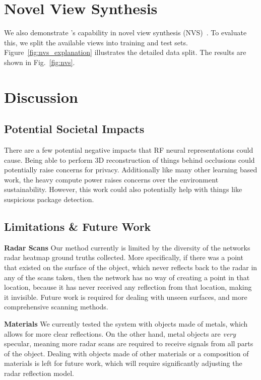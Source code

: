 
\section{Novel View Synthesis}
\label{sec:app-nvs}
We also demonstrate \name{}'s capability in novel view synthesis  (NVS)~\cite{mildenhall2021nerf}.
To evaluate this, we split the available views into training and test sets.
Figure~\ref{fig:nvs_explanation} illustrates the detailed data split. The results are shown in Fig.~\ref{fig:nvs}.


\section{Discussion}
\label{sec:app-discussion}
\subsection{Potential Societal Impacts}
There are a few potential negative impacts that RF neural representations could cause. Being able to perform 3D reconstruction of things behind occlusions could potentially raise concerns for privacy. Additionally like many other learning based work, the heavy compute power raises concerns over the environment sustainability. However, this work could also potentially help with things like suspicious package detection.

\subsection{Limitations \& Future Work}
\noindent \textbf{Radar Scans }Our method currently is limited by the diversity of the networks radar heatmap ground truths collected. More specifically, if there was a point that existed on the surface of the object, which never reflects back to the radar in any of the scans taken, then the network has no way of creating a point in that location, because it has never received any reflection from that location, making it invisible. Future work is required for dealing with unseen surfaces, and more comprehensive scanning methods.

\noindent \textbf{Materials} We currently tested the system with objects made of metals, which allows for more clear reflections. On the other hand, metal objects are \textit{very} specular, meaning more radar scans are required to receive signals from all parts of the object. Dealing with objects made of other materials or a composition of materials is left for future work, which will require significantly adjusting the radar reflection model.

